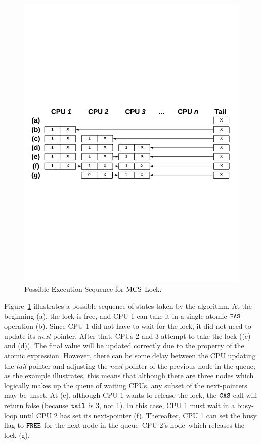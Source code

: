 \begin{figure}
\begin{center}
\includegraphics[width=0.9\linewidth]{figs/mcslock/mcsex}
\end{center}
\caption{Possible Execution Sequence for  $\mathrm{MCS}$ Lock.}
\label{fig:chapter:mcslock:mcs-example}
\end{figure}

Figure~\ref{fig:chapter:mcslock:mcs-example} 
illustrates a possible sequence of states taken by the algorithm. 
At the beginning (a),
the lock is free, and CPU 1 can take it in a single atomic ${\mathrm{\texttt{FAS}}}$ operation (b). 
Since CPU 1 did not have to wait for the lock, it did not need to update its \textit{next}-pointer. 
After that, CPUs 2 and 3 attempt to take the lock ((c) and (d)). 
The final value will be updated correctly due to the property of the atomic expression.
 However, there can be some delay between the CPU updating the \textit{tail} pointer and adjusting the \textit{next}-pointer of the previous node in the queue; as the example illustrates, this means that although there are three nodes which logically makes up the queue of waiting CPUs, 
 any subset of the next-pointers may be unset. 
 At (e), although CPU 1 wants to release the lock, 
 the ${\mathrm{\texttt{CAS}}}$ call will return false (because ${\mathrm{\texttt{tail}}}$ is 3, not 1). 
 In this case,  CPU 1 must wait in a busy-loop until CPU 2 has set its next-pointer (f). 
 Thereafter, CPU 1 can set the busy flag to ${\mathrm{\texttt{FREE}}}$ for the next node in the queue--CPU 2’s node--which releases the lock (g).






